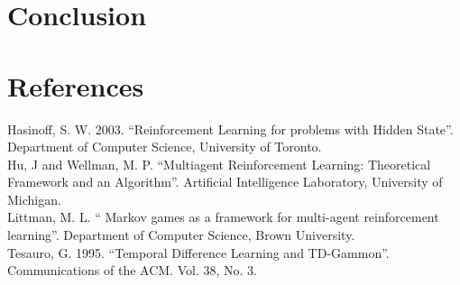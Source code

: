 \documentclass[letterpaper]{article}
\begin{document}

\section{Conclusion}


\section{References}
Hasinoff, S. W. 2003. ``Reinforcement Learning for problems with Hidden State''. Department of Computer Science, University of Toronto.\\

Hu, J and Wellman, M. P. ``Multiagent Reinforcement Learning: Theoretical Framework and an Algorithm''. Artificial Intelligence Laboratory, University of Michigan.\\

Littman, M. L. `` Markov games as a framework for multi-agent reinforcement learning''. Department of Computer Science, Brown University.\\

Tesauro, G. 1995. ``Temporal Difference Learning and TD-Gammon''. Communications of the ACM. Vol. 38, No. 3.
\end{document}
